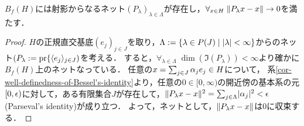 \documentclass[uplatex,dvipdfmx]{jsreport}
\begin{document}
\begin{lemma}[近似的単位元の構成]
    $B_f(H)$には射影からなるネット$(P_\lambda)_{\lambda\in\Lambda}$が存在し，$\forall_{x\in H}\;\|P_\lambda x-x\|\to 0$を満たす．
\end{lemma}
\begin{proof}
    $H$の正規直交基底${(e_j)}_{j\in J}$を取り，$\Lambda:=\left\{\lambda\in P(J)\mid \lvert\lambda\rvert<\infty\right\}$からのネット$(P_\lambda:=\mathrm{pr}\{\langle e_j\rangle_{j\in J})$を考える．
    すると，$\forall_{\lambda\in\Lambda}\;\dim(\Im(P_\lambda))<\infty$より確かに$B_f(H)$上のネットなっている．
    任意の$x=\sum_{j\in J}\alpha_je_j\in H$について，
    系\ref{cor-well-definedness-of-Bessel's-identity}より，任意の$0\in[0,\infty)$の開近傍の基本系の元$[0,\epsilon)$に対して，ある有限集合$J$が存在して，$\|P_\lambda x-x\|^2=\sum_{j\in\Lambda}\lvert\alpha_j\rvert^2<\epsilon$(Parseval's identity)が成り立つ．
    よって，ネットとして，$\|P_\lambda x-x\|$は$0$に収束する．
\end{proof}
\end{document}
